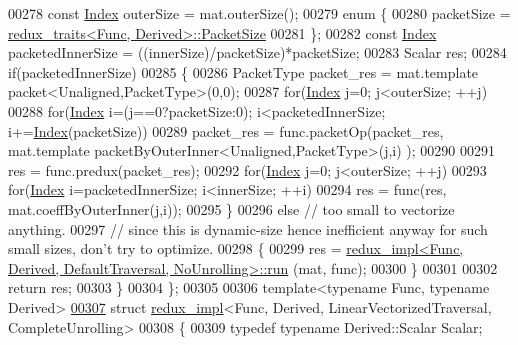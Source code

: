 \begin{DoxyCode}
00278     \textcolor{keyword}{const} \hyperlink{namespace_eigen_a62e77e0933482dafde8fe197d9a2cfde}{Index} outerSize = mat.outerSize();
00279     \textcolor{keyword}{enum} \{
00280       packetSize = \hyperlink{struct_eigen_1_1internal_1_1redux__traits}{redux\_traits<Func, Derived>::PacketSize}
00281     \};
00282     \textcolor{keyword}{const} \hyperlink{namespace_eigen_a62e77e0933482dafde8fe197d9a2cfde}{Index} packetedInnerSize = ((innerSize)/packetSize)*packetSize;
00283     Scalar res;
00284     \textcolor{keywordflow}{if}(packetedInnerSize)
00285     \{
00286       PacketType packet\_res = mat.template packet<Unaligned,PacketType>(0,0);
00287       \textcolor{keywordflow}{for}(\hyperlink{namespace_eigen_a62e77e0933482dafde8fe197d9a2cfde}{Index} j=0; j<outerSize; ++j)
00288         \textcolor{keywordflow}{for}(\hyperlink{namespace_eigen_a62e77e0933482dafde8fe197d9a2cfde}{Index} i=(j==0?packetSize:0); i<packetedInnerSize; i+=\hyperlink{namespace_eigen_a62e77e0933482dafde8fe197d9a2cfde}{Index}(packetSize))
00289           packet\_res = func.packetOp(packet\_res, mat.template packetByOuterInner<Unaligned,PacketType>(j,i)
      );
00290 
00291       res = func.predux(packet\_res);
00292       \textcolor{keywordflow}{for}(\hyperlink{namespace_eigen_a62e77e0933482dafde8fe197d9a2cfde}{Index} j=0; j<outerSize; ++j)
00293         \textcolor{keywordflow}{for}(\hyperlink{namespace_eigen_a62e77e0933482dafde8fe197d9a2cfde}{Index} i=packetedInnerSize; i<innerSize; ++i)
00294           res = func(res, mat.coeffByOuterInner(j,i));
00295     \}
00296     \textcolor{keywordflow}{else} \textcolor{comment}{// too small to vectorize anything.}
00297          \textcolor{comment}{// since this is dynamic-size hence inefficient anyway for such small sizes, don't try to
       optimize.}
00298     \{
00299       res = \hyperlink{struct_eigen_1_1internal_1_1redux__impl}{redux\_impl<Func, Derived, DefaultTraversal, NoUnrolling>::run}
      (mat, func);
00300     \}
00301 
00302     \textcolor{keywordflow}{return} res;
00303   \}
00304 \};
00305 
00306 \textcolor{keyword}{template}<\textcolor{keyword}{typename} Func, \textcolor{keyword}{typename} Derived>
\hyperlink{struct_eigen_1_1internal_1_1redux__impl_3_01_func_00_01_derived_00_01_linear_vectorized_traversal_00_01_complete_unrolling_01_4}{00307} \textcolor{keyword}{struct }\hyperlink{struct_eigen_1_1internal_1_1redux__impl}{redux\_impl}<Func, Derived, LinearVectorizedTraversal, CompleteUnrolling>
00308 \{
00309   \textcolor{keyword}{typedef} \textcolor{keyword}{typename} Derived::Scalar Scalar;

\end{DoxyCode}
